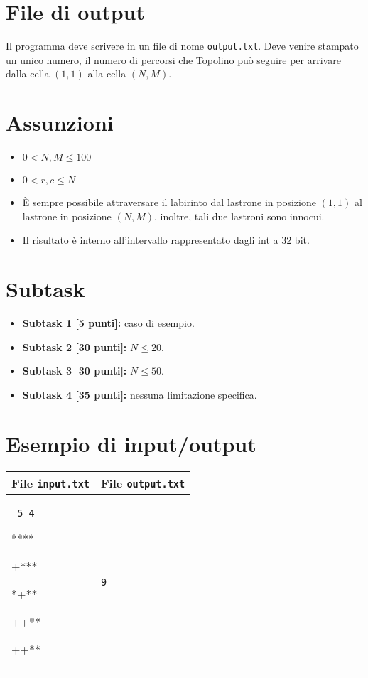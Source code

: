 \documentclass[a4paper,11pt]{article}
\newcommand{\file}[1]{\texttt{#1}}
\newcommand{\esempio}[2]{
\noindent\begin{minipage}{\textwidth}
\begin{tabular}{|p{11cm}|p{5cm}|}
	\hline
	\textbf{File \file{input.txt}} & \textbf{File \file{output.txt}}\\
	\hline
	\tt \small #1 &
	\tt \small #2 \\
	\hline
\end{tabular}
\end{minipage}
}
\begin{document}
\section*{File di output}
Il programma deve scrivere in un file di nome \file{output.txt}. Deve venire stampato un unico numero, il numero di percorsi che Topolino può seguire per arrivare dalla cella $(1,1)$ alla cella $(N,M)$.

\section*{Assunzioni}
\begin{itemize}
\item $0 < N,M \le 100$
\item $0 < r,c \le N$
\item È sempre possibile attraversare il labirinto dal lastrone in posizione $(1, 1)$ al lastrone in
posizione $(N, M)$, inoltre, tali due lastroni sono innocui.
\item Il risultato è interno all'intervallo rappresentato dagli int a $32$ bit.

\end{itemize}

\section*{Subtask}
\begin{itemize}
\item \textbf{Subtask 1 [\phantom{1}5 punti]:} caso di esempio.
\item \textbf{Subtask 2 [30 punti]:} $N \le 20$.
\item \textbf{Subtask 3 [30 punti]:} $N \le 50$.
\item \textbf{Subtask 4 [35 punti]:} nessuna limitazione specifica.
\end{itemize}


\section*{Esempio di input/output}
\esempio{
5 4

****

+***

*+**

++**

++**
}{9}
\end{document}
